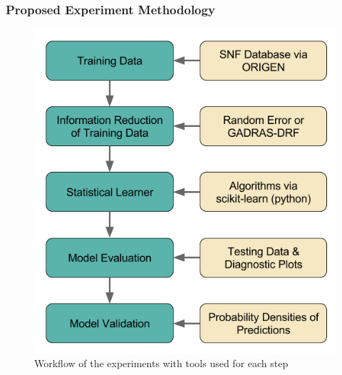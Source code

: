 
\begin{frame}
  \frametitle{Proposed Experiment Methodology}
  \begin{figure}[h!]
    \centering
    \includegraphics[height=0.8\textheight]{./figures/methodology.png}
    \caption{Workflow of the experiments with tools used for each step}
  \end{figure}
\end{frame}

